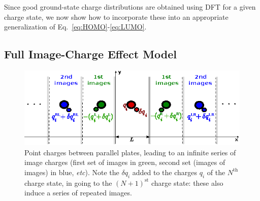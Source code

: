 \documentclass[aip,jcp,a4paper,reprint,floatfix,superscriptaddress]{revtex4-1}
\begin{document}
Since good ground-state charge distributions are obtained using DFT for a given charge state, we now show how to incorporate these into an appropriate generalization of Eq.~\eqref{eq:HOMO}-\eqref{eq:LUMO}.

\subsection{Full Image-Charge Effect Model}\label{full_model}

\begin{figure}
\includegraphics[width=\columnwidth]{mirrorplanes}
\caption{Point charges between parallel plates, leading to an infinite series of image charges (first set of images in green, second set (images of images) in blue, \emph{etc}). Note the $\delta q_i$ added to the charges $q_i$ of the $N^\text{th}$ charge state, in going to the $(N+1)^\text{st}$ charge state: these also induce a series of repeated images.}\label{fg:imagemodel}
\end{figure}
\end{document}
